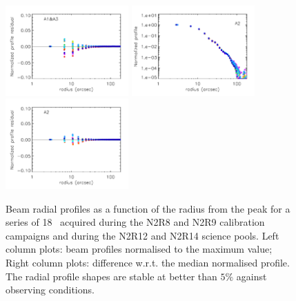 \begin{figure}[ht!]
   \includegraphics[clip, width=0.42\textwidth]{Figures/Beams/plot_profile_diff_wrt_median_1mm.pdf}
   \includegraphics[clip, width=0.42\textwidth]{Figures/Beams/plot_profiles_a2.pdf}
   \includegraphics[clip, width=0.42\textwidth]{Figures/Beams/plot_profile_diff_wrt_median_a2.pdf}
  \caption[Stability of the beam profile]{Beam radial profiles as a
    function of the radius from the peak for a series of 18
    \bm\ acquired during the N2R8 and N2R9 calibration campaigns and
    during the N2R12 and N2R14 science pools. Left column plots: 
    beam profiles normalised to the maximum value; Right column plots: difference w.r.t. the median normalised profile. The radial profile shapes are stable at better than $5\%$ against observing conditions.}
  \label{fig:beam_prof}
\end{figure}

